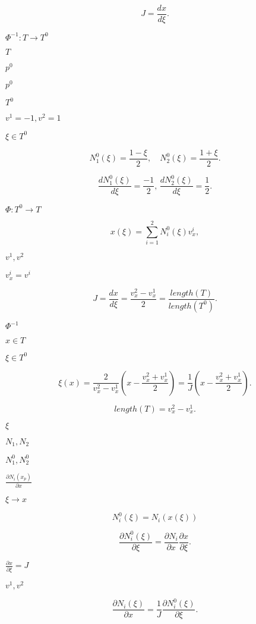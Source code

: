 \documentclass{article}
\begin{document}
\[ J = \frac{dx}{d\xi}. \]
\pagebreak

$ \Phi^{-1} : T \to T^0 $
\pagebreak

$ T$
\pagebreak

$ p^0$
\pagebreak

$ p^0 $
\pagebreak

$T^0 $
\pagebreak

$ v^1 = -1, v^2 = 1 $
\pagebreak

$ \xi \in T^0 $
\pagebreak

\[N^0_1(\xi) = \frac{1 - \xi}{2}, \quad N^0_2(\xi) = \frac{1 + \xi}{2}. \]
\pagebreak

\[\frac{d N^0_1(\xi)}{d\xi} = \frac{-1}{2}, \, \frac{d N^0_2(\xi)}{d\xi} = \frac{1}{2}. \]
\pagebreak

$ \Phi: T^0 \to T $
\pagebreak

\[ x(\xi) = \sum_{i=1}^2 N^0_i(\xi) v^i_x, \]
\pagebreak

$ v^1, v^2$
\pagebreak

$ v^i_x = v^i $
\pagebreak

\[ J = \frac{dx}{d\xi} = \frac{v^2_x - v^1_x}{2} = \frac{length(T) }{length(T^0)}. \]
\pagebreak

$ \Phi^{-1} $
\pagebreak

$ x \in T $
\pagebreak

$ \xi \in T^0$
\pagebreak

\[ \xi(x) = \frac{2}{v^2_x - v^1_x} (x - \frac{v^2_x + v^1_x}{2}) = \frac{1}{J}(x - \frac{v^2_x + v^1_x}{2}). \]
\pagebreak

\[ length(T) = v^2_x - v^1_x. \]
\pagebreak

$ \xi $
\pagebreak

$ N_1, N_2 $
\pagebreak

$ N^0_1, N^0_2 $
\pagebreak

$ \frac{\partial N_i(x_p)}{\partial x}$
\pagebreak

$ \xi \to x $
\pagebreak

\[ N^0_i(\xi) = N_i(x(\xi)) \]
\pagebreak

\[ \frac{\partial N^0_i(\xi)}{\partial \xi} = \frac{\partial N_i}{\partial x} \frac{\partial x}{\partial \xi}. \]
\pagebreak

$ \frac{\partial x}{\partial \xi} = J $
\pagebreak

$ v^1, v^2 $
\pagebreak

\[ \frac{\partial N_i(\xi)}{\partial x} = \frac{1}{J} \frac{\partial N^0_i(\xi)}{\partial \xi}. \]
\pagebreak
\end{document}
